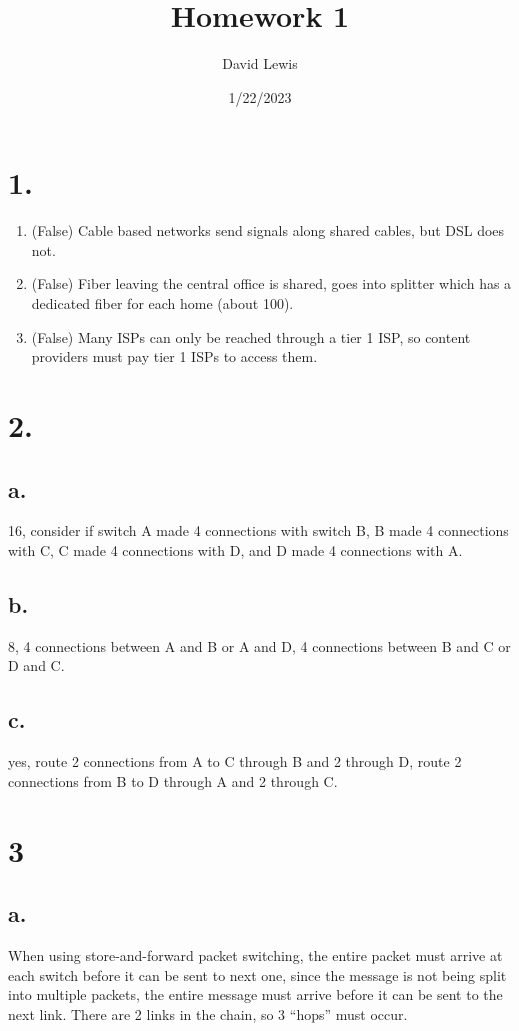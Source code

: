 \documentclass[11pt]{article}
\author{David Lewis}
\date{1/22/2023}
\title{Homework 1}
\begin{document}
\maketitle
\section*{1.}
\label{sec:orgc364e5d}
\begin{enumerate}
\item (False) Cable based networks send signals along shared cables, but DSL does not.
\item (False) Fiber leaving the central office is shared, goes into splitter which
has a dedicated fiber for each home (about 100).
\item (False) Many ISPs can only be reached through a tier 1 ISP, so content
providers must pay tier 1 ISPs to access them.
\end{enumerate}

\section*{2.}
\label{sec:org98b616d}
\subsection*{a.}
\label{sec:orgceb741f}
16, consider if switch A made 4 connections with switch B, B made 4 connections
with C, C made 4 connections with D, and D made 4 connections with A.
\subsection*{b.}
\label{sec:org1f03852}
8, 4 connections between A and B or A and D, 4 connections between B and C or D
and C.
\subsection*{c.}
\label{sec:org41833c4}
yes, route 2 connections from A to C through B and 2 through D, route 2
connections from B to D through A and 2 through C.
\section*{3}
\label{sec:orgdcfa2b0}
\subsection*{a.}
\label{sec:orgf653fc7}
When using store-and-forward packet switching, the entire packet must arrive at
each switch before it can be sent to next one, since the message is not being
split into multiple packets, the entire message must arrive before it can be
sent to the next link. There are 2 links in the chain, so 3 ``hops'' must occur.
\end{document}
